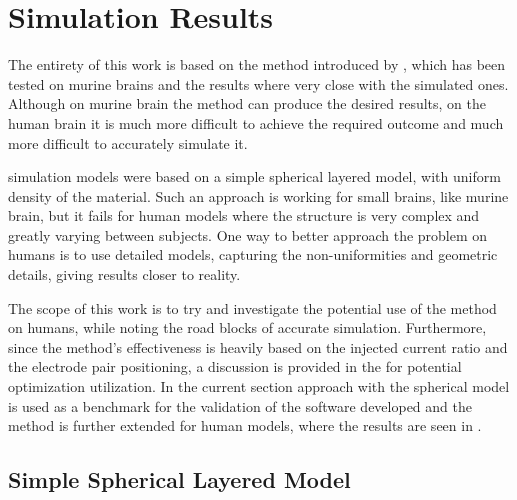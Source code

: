 \pagebreak
\chapter{Simulation Results}

The entirety of this work is based on the method introduced by , which has been tested on murine brains and the results where very close with the simulated ones. Although on murine brain the method can produce the desired results, on the human brain it is much more difficult to achieve the required outcome and much more difficult to accurately simulate it.

 simulation models were based on a simple spherical layered model, with uniform density of the material. Such an approach is working for small brains, like murine brain, but it fails for human models where the structure is very complex and greatly varying between subjects. One way to better approach the problem on humans is to use detailed models, capturing the non-uniformities and geometric details, giving results closer to reality.

The scope of this work is to try and investigate the potential use of the  method on humans, while noting the road blocks of accurate simulation. Furthermore, since the method's effectiveness is heavily based on the injected current ratio and the electrode pair positioning, a discussion is provided in the  for potential optimization utilization. In the current section  approach with the spherical model is used as a benchmark for the validation of the software developed and the method is further extended for human models, where the results are seen in .

\section{Simple Spherical Layered Model}


